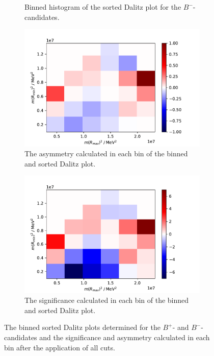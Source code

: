 \begin{figure}[H]
\begin{subfigure}{0.49\textwidth}
    \caption{Binned histogram of the sorted Dalitz plot for the $B^-$-candidates.}
    \label{f7b}
  \end{subfigure}
  \begin{subfigure}{0.49\textwidth}
    \includegraphics[width=\textwidth]{plots/Dalitz_sorted_Asym.pdf}
    \caption{The asymmetry calculated in each bin of the binned and sorted Dalitz plot.}
    \label{f7c}
  \end{subfigure}
  \begin{subfigure}{0.49\textwidth}
    \includegraphics[width=\textwidth]{plots/Dalitz_sorted_bin_cut_sig.pdf}
    \caption{The significance calculated in each bin of the binned and sorted Dalitz plot.}
    \label{f7d}
  \end{subfigure}
  \caption{The binned sorted Dalitz plots determined for the $B^+$- and $B^-$-candidates and the significance and asymmetry calculated in each bin after the application 
  of all cuts.}
  \label{f7}
\end{figure}

